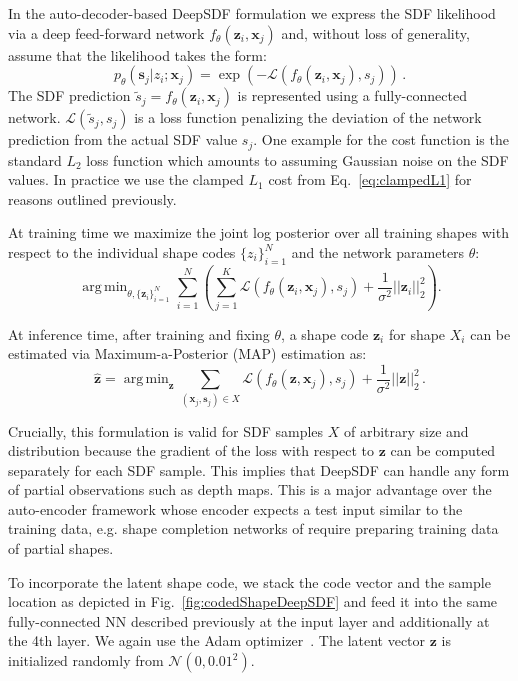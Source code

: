 \documentclass[10pt,twocolumn,letterpaper]{article}
\DeclareMathOperator*{\argmin}{arg\,min}
\begin{document}
In the auto-decoder-based DeepSDF formulation we express the SDF likelihood via a deep feed-forward network $f_\theta(\bm{z}_i,\bm{x}_j)$ and, without loss of generality, assume that the likelihood takes the form:
\begin{equation}
   p_{\theta}(\bm{s}_j | z_i; \bm{x}_j) = \exp(-\mathcal{L}(f_\theta (\bm{z}_i,\bm{x}_j),s_j)) \,.
\end{equation}
The SDF prediction $\tilde{s}_j = f_\theta (\bm{z}_i,\bm{x}_j)$ is represented using a fully-connected network. $\mathcal{L}(\tilde{s}_j, s_j)$ is a loss function penalizing the deviation of the network prediction from the actual SDF value $s_j$. One example for the cost function is the standard $L_2$ loss function which amounts to assuming Gaussian noise on the SDF values. In practice we use the clamped $L_1$ cost from Eq.~\ref{eq:clampedL1} for reasons outlined previously.

At training time we maximize the joint log posterior over all training shapes with respect to the individual shape codes $\{z_i\}_{i=1}^N$ and the network parameters $\theta$:
\begin{equation} \label{eq:objective}
\argmin_{\theta, \{\bm{z}_i\}_{i=1}^N} \sum_{i=1}^N \left( \sum_{j=1}^K \mathcal{L}(f_\theta (\bm{z}_i,\bm{x}_j),s_j)+\frac{1}{\sigma^{2}}||\bm{z}_i ||_2^2 \right).
\end{equation}

At inference time, after training and fixing $\theta$, a shape code $\bm{z}_i$ for shape $X_i$ can be estimated via Maximum-a-Posterior (MAP) estimation as:
 \begin{equation} \label{eq:testtime}
\hat{\bm{z}}= \argmin_{\bm{z}} \sum_{(\bm{x}_j,\bm{s}_j)\in X} \mathcal{L}(f_\theta (\bm{z},\bm{x}_j),s_j)+\frac{1}{\sigma^{2}}||\bm{z}||_2^2 \,.
\end{equation}

Crucially, this formulation is valid for SDF samples $X$ of arbitrary size and distribution because the gradient of the loss with respect to $\bm{z}$ can be computed separately for each SDF sample. This implies that DeepSDF can handle any form of partial observations such as depth maps. 
This is a major advantage over the auto-encoder framework whose encoder expects a test input similar to the training data, e.g. shape completion networks of \cite{dai2017shape,yuan2018pcn} require preparing training data of partial shapes.

To incorporate the latent shape code, we stack the code vector and the sample location as depicted in Fig.~\ref{fig:codedShapeDeepSDF} and feed it into the same fully-connected NN described previously at the input layer and additionally at the 4th layer.
We again use the Adam optimizer~\cite{kingma2014adam}.
The latent vector $\bm{z}$ is initialized randomly from $\mathcal{N}(0,0.01^2)$.
\end{document}
